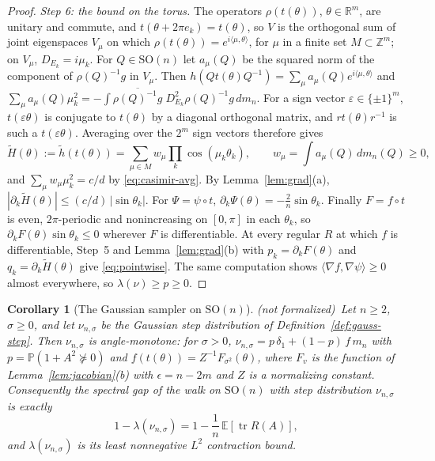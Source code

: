 \documentclass[11pt]{amsart}
\newtheorem{corollary}[theorem]{Corollary}
\theoremstyle{definition}
\theoremstyle{remark}
\newcommand{\notformal}{\textup{(not formalized)}}
\newcommand{\R}{\mathbb{R}}
\newcommand{\Z}{\mathbb{Z}}
\newcommand{\E}{\mathbb{E}}
\newcommand{\Prob}{\mathbb{P}}
\newcommand{\SO}{\mathrm{SO}}
\newcommand{\tr}{\operatorname{tr}}
\newcommand{\ip}[2]{\langle #1,#2\rangle}
\begin{document}
\begin{proof}
\emph{Step 6: the bound on the torus.}  The operators $\rho(t(\theta))$, $\theta\in\R^m$, are unitary
and commute, and $t(\theta+2\pi e_k)=t(\theta)$, so $V$ is the orthogonal sum of joint eigenspaces
$V_\mu$ on which $\rho(t(\theta))=e^{i\ip\mu\theta}$, for $\mu$ in a finite set $M\subset\Z^m$; on
$V_\mu$, $D_{E_k}=i\mu_k$.  For $Q\in\SO(n)$ let $a_\mu(Q)$ be the squared norm of the component
of $\rho(Q)^{-1}g$ in $V_\mu$.  Then $h(Qt(\theta)Q^{-1})=\sum_\mu a_\mu(Q)e^{i\ip\mu\theta}$ and
$\sum_\mu a_\mu(Q)\mu_k^2=-\int\overline{\rho(Q)^{-1}g}\;D_{E_k}^2\rho(Q)^{-1}g\,dm_n$.  For a sign
vector $\varepsilon\in\{\pm1\}^m$, $t(\varepsilon\theta)$ is conjugate to $t(\theta)$ by a diagonal
orthogonal matrix, and $rt(\theta)r^{-1}$ is such a $t(\varepsilon\theta)$.  Averaging over the
$2^m$ sign vectors therefore gives
\[
  \tilde H(\theta):=\tilde h(t(\theta))=\sum_{\mu\in M}w_\mu\prod_k\cos(\mu_k\theta_k),\qquad
  w_\mu=\int a_\mu(Q)\,dm_n(Q)\ge0,
\]
and $\sum_\mu w_\mu\mu_k^2=c/d$ by \eqref{eq:casimir-avg}.  By Lemma~\ref{lem:grad}(a),
$|\partial_k\tilde H(\theta)|\le(c/d)\,|\sin\theta_k|$.  For $\Psi=\psi\circ t$,
$\partial_k\Psi(\theta)=-\frac2n\sin\theta_k$.  Finally $F=f\circ t$ is even, $2\pi$-periodic and
nonincreasing on $[0,\pi]$ in each $\theta_k$, so $\partial_kF(\theta)\sin\theta_k\le0$ wherever
$F$ is differentiable.  At every regular $R$ at which $f$ is differentiable, Step~5 and
Lemma~\ref{lem:grad}(b) with $p_k=\partial_kF(\theta)$ and $q_k=\partial_k\tilde H(\theta)$ give
\eqref{eq:pointwise}.  The same computation shows $\ip{\nabla f}{\nabla\psi}\ge0$ almost
everywhere, so $\lambda(\nu)\ge p\ge0$.
\end{proof}

\begin{corollary}[The Gaussian sampler on $\SO(n)$]\label{cor:son-gauss}
\notformal\ Let $n\ge2$, $\sigma\ge0$, and let $\nu_{n,\sigma}$ be the Gaussian step distribution
of Definition~\ref{def:gauss-step}.  Then $\nu_{n,\sigma}$ is angle-monotone: for $\sigma>0$,
$\nu_{n,\sigma}=p\,\delta_1+(1-p)\,f\,m_n$ with $p=\Prob(1+A^2\not\succeq0)$ and
$f(t(\theta))=Z^{-1}F_{\sigma^2}(\theta)$, where $F_v$ is the function of
Lemma~\ref{lem:jacobian}(b) with $\epsilon=n-2m$ and $Z$ is a normalizing constant.  Consequently
the spectral gap of the walk on $\SO(n)$ with step distribution $\nu_{n,\sigma}$ is exactly
\[
  1-\lambda(\nu_{n,\sigma})=1-\frac1n\,\E[\tr R(A)],
\]
and $\lambda(\nu_{n,\sigma})$ is its least nonnegative $L^2$ contraction bound.
\end{corollary}
\end{document}
